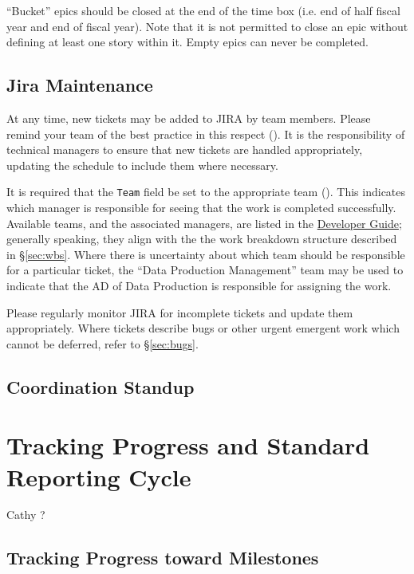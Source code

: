 ``Bucket'' epics should be closed at the end of the time box (i.e. end of half fiscal year and end of fiscal year).
Note that it is not permitted to close an \gls{epic} without defining at least one \gls{story} within it.
Empty \glspl{epic} can never be completed.


\subsection{Jira Maintenance}
\label{sec:jira-maintenance}

At any time, new tickets may be added to \gls{JIRA} by team members.
Please remind your team of the best practice in this respect ().
It is the responsibility of technical managers to ensure that new tickets are handled appropriately, updating the schedule to include them where necessary.

It is required that the \texttt{Team} field be set to the appropriate team ().
This indicates which manager is responsible for \gls{seeing} that the work is completed successfully.
Available teams, and the associated managers, are listed in the \href{https://developer.lsst.io/processes/jira_agile.html}{Developer Guide}; generally speaking, they align with the the work breakdown structure described in \S\ref{sec:wbs}.
Where there is uncertainty about which team should be responsible for a particular ticket, the “Data Production Management” team may be used to indicate that the \gls{AD} of Data Production is responsible for assigning the work.

Please regularly monitor \gls{JIRA} for incomplete tickets and update them appropriately.
Where tickets describe bugs or other urgent emergent work which cannot be deferred, refer to \S\ref{sec:bugs}.

\subsection{Coordination Standup}
\label{sec:sup}

\section{Tracking Progress and Standard Reporting Cycle}
\label{sec:reporting-cycle}
 Cathy ?

\subsection{Tracking Progress toward Milestones}
\label{sec:track-progress}

